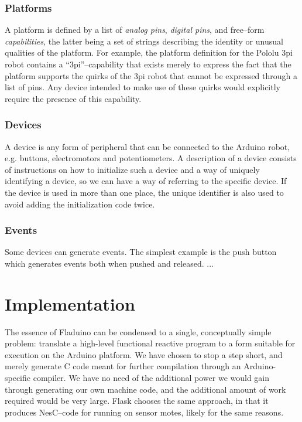 \documentclass[a4paper, oneside, draft]{memoir}
\begin{document}
\subsection{Platforms}

A platform is defined by a list of \textit{analog pins},
\textit{digital pins}, and free--form \textit{capabilities}, the
latter being a set of strings describing the identity or unusual
qualities of the platform.  For example, the platform definition for
the Pololu 3pi robot contains a ``3pi''--capability that exists merely
to express the fact that the platform supports the quirks of the 3pi
robot that cannot be expressed through a list of pins.  Any device
intended to make use of these quirks would explicitly require the
presence of this capability.

\subsection{Devices}
A device is any form of peripheral that can be connected to the
Arduino robot, e.g. buttons, electromotors and potentiometers.  A
description of a device consists of instructions on how to initialize
such a device and a way of uniquely identifying a device, so we can
have a way of referring to the specific device.  If the device is used
in more than one place, the unique identifier is also used to avoid
adding the initialization code twice.

\subsection{Events}
Some devices can generate events.  The simplest example is the push
button which generates events both when pushed and released.  ...

\chapter{Implementation}

The essence of Fladuino can be condensed to a single, conceptually
simple problem: translate a high-level functional reactive program to
a form suitable for execution on the Arduino platform.  We have chosen
to stop a step short, and merely generate C code meant for further
compilation through an Arduino-specific compiler.  We have no need of
the additional power we would gain through generating our own machine
code, and the additional amount of work required would be very large.
Flask chooses the same approach, in that it produces NesC--code for
running on sensor motes, likely for the same reasons.
\end{document}
